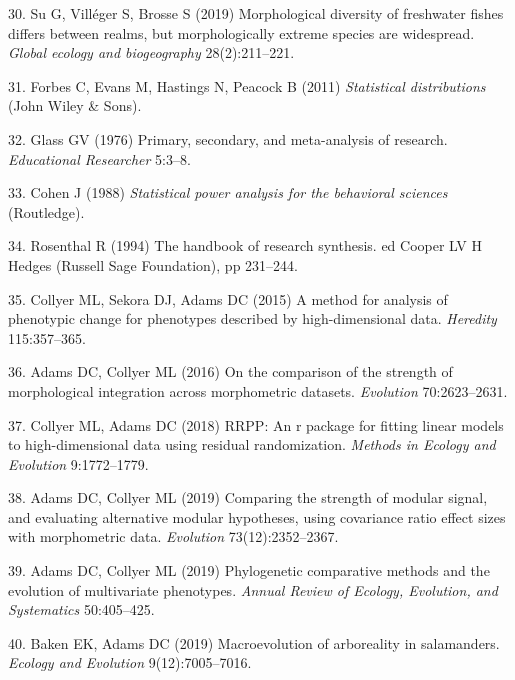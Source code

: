 \documentclass[9pt,twocolumn,twoside,lineno]{pnas-new}
\begin{document}
\leavevmode\hypertarget{ref-Su2019}{}%
30. Su G, Villéger S, Brosse S (2019) Morphological diversity of
freshwater fishes differs between realms, but morphologically extreme
species are widespread. \emph{Global ecology and biogeography}
28(2):211--221.

\leavevmode\hypertarget{ref-Forbes2011}{}%
31. Forbes C, Evans M, Hastings N, Peacock B (2011) \emph{Statistical
distributions} (John Wiley \& Sons).

\leavevmode\hypertarget{ref-Glass1976}{}%
32. Glass GV (1976) Primary, secondary, and meta-analysis of research.
\emph{Educational Researcher} 5:3--8.

\leavevmode\hypertarget{ref-Cohen1988}{}%
33. Cohen J (1988) \emph{Statistical power analysis for the behavioral
sciences} (Routledge).

\leavevmode\hypertarget{ref-Rosenthal1994}{}%
34. Rosenthal R (1994) The handbook of research synthesis. ed Cooper LV
H Hedges (Russell Sage Foundation), pp 231--244.

\leavevmode\hypertarget{ref-Collyer_et_al2015a}{}%
35. Collyer ML, Sekora DJ, Adams DC (2015) A method for analysis of
phenotypic change for phenotypes described by high-dimensional data.
\emph{Heredity} 115:357--365.

\leavevmode\hypertarget{ref-AdamsCollyer2016}{}%
36. Adams DC, Collyer ML (2016) On the comparison of the strength of
morphological integration across morphometric datasets. \emph{Evolution}
70:2623--2631.

\leavevmode\hypertarget{ref-CollyerAdams2018}{}%
37. Collyer ML, Adams DC (2018) RRPP: An r package for fitting linear
models to high-dimensional data using residual randomization.
\emph{Methods in Ecology and Evolution} 9:1772--1779.

\leavevmode\hypertarget{ref-AdamsCollyer2019b}{}%
38. Adams DC, Collyer ML (2019) Comparing the strength of modular
signal, and evaluating alternative modular hypotheses, using covariance
ratio effect sizes with morphometric data. \emph{Evolution}
73(12):2352--2367.

\leavevmode\hypertarget{ref-AdamsCollyer2019}{}%
39. Adams DC, Collyer ML (2019) Phylogenetic comparative methods and the
evolution of multivariate phenotypes. \emph{Annual Review of Ecology,
Evolution, and Systematics} 50:405--425.

\leavevmode\hypertarget{ref-Baken2019}{}%
40. Baken EK, Adams DC (2019) Macroevolution of arboreality in
salamanders. \emph{Ecology and Evolution} 9(12):7005--7016.
\end{document}

